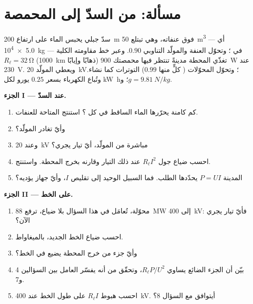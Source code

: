 \section{مسألة: من السدّ إلى المحمصة}

\begin{problem}
\label{pb:g11:circuits-and-power:1}
سدّ جبلي يحبس الماء على ارتفاع \qty{200}{m} فوق عنفاته، وهي تبتلع
\qty{50}{m^3} --- أي \qty{5.0e4}{kg} --- في ؛ وتحوّل العنفة والمولّد التناوبي
 $0.90$. وعبر خط مقاومته الكلية
$R_\ell = \qty{32}{\ohm}$ (\qty{1000}{km} ذهابًا وإيابًا) تغذّي المحطة
مدينةً تنتظر فيها محمصتك \qty{900}{W} عند \qty{230}{V}. ويعطي
المولّد \qty{20}{kV}؛ وتحوّل المحوّلات ( كلٍّ منها $0.99$)
التوترات كما نشاء. وتُباع الكهرباء بسعر $0.25$ يورو لكل
\unit{kW.h}؛ و$g = \qty{9.81}{N/kg}$.

\medskip
\noindent\textbf{الجزء I --- عند السدّ.}
\begin{enumerate}
  \item كم  كامنة يحرّرها الماء الساقط في كل
        ؟ استنتج  المتاحة للعنفات.
  \item وأيّ  تغادر المولّد؟
  \item وعند \qty{20}{kV} مباشرة من المولّد، أيّ تيار يجري؟
  \item احسب ضياع جول $R_\ell I^2$ عند ذلك التيار وقارنه
        بخرج المحطة. واستنتج.
  \item {} المدينة $P = UI$ يحدّدها الطلب. فما السبيل الوحيد
        إلى تقليص $I$، وأيّ جهاز يؤديه؟
\end{enumerate}

\medskip
\noindent\textbf{الجزء II --- على الخط.}
\begin{enumerate}[resume]
  \item محوّلة، تُعامَل في هذا السؤال بلا ضياع، ترفع
        \qty{88}{MW} إلى \qty{400}{kV}: فأيّ تيار يجري الآن؟
  \item احسب ضياع الخط الجديد، بالميغاواط.
  \item وأيّ جزء من خرج المحطة يضيع في الخط؟
  \item بيّن أن الجزء الضائع يساوي $R_\ell P/U^2$، وتحقّق من أنه
        يفسّر العامل بين السؤالين 4 و7.
  \item احسب هبوط  $R_\ell I$ على طول الخط عند
        \qty{400}{kV}. أيتوافق مع السؤال 8؟
\end{enumerate}


\end{problem}
